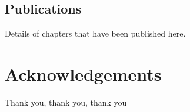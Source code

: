 \tocless\section{Publications}
Details of chapters that have been published here. %

\chapter{Acknowledgements}

Thank you, thank you, thank you



\listoftables



\listoffigures


